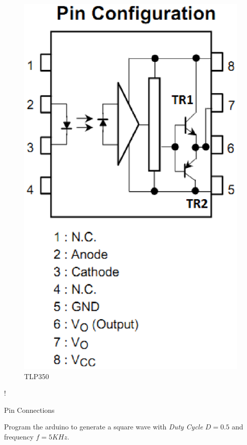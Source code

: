 \documentclass[journal,12pt,twocolumn]{IEEEtran}
\begin{document}
\begin{figure}[!h]
\centering
\includegraphics[width=\columnwidth]{./figs/pinout.eps}
\caption{ TLP350}  
\label{fig5}
\end{figure}

\begin{table}[!h]
\centering
\resizebox {\columnwidth} {!} {

}
\caption{Pin Connections} 
\label{table:connections}
\end{table}    
\begin{problem}
Program the arduino to generate a square wave with {\em Duty Cycle} $D=0.5$ and frequency $f=5KHz$.
\end{problem}
\solution
 
 
\end{document}
